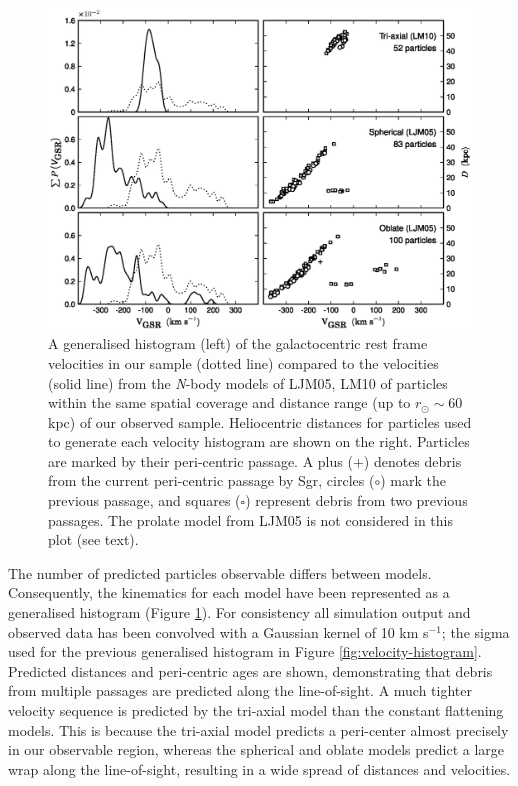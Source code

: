 \documentclass[preprint2]{aastex}
\begin{document}
	\begin{figure}[t!]
		\includegraphics[width=\textwidth]{./sgr_velocities.eps}
		\caption{A generalised histogram (left) of the galactocentric rest frame velocities in our sample (dotted line) compared to the velocities (solid line) from the \textit{N}-body models of LJM05, LM10 of particles within the same spatial coverage and distance range (up to $r_\odot \sim 60$ kpc) of our observed sample. Heliocentric distances for particles used to generate each velocity histogram are shown on the right. Particles are marked by their peri-centric passage. A plus ($+$) denotes debris from the current peri-centric passage by Sgr, circles ($\circ$) mark the previous passage, and squares ($\square$) represent debris from two previous passages. The prolate model from LJM05 is not considered in this plot (see text).}
		\label{fig:law-vel-compare}
	\end{figure}
	
	The number of predicted particles observable differs between models. Consequently, the kinematics for each model have been represented as a generalised histogram (Figure \ref{fig:law-vel-compare}). For consistency all simulation output and observed data has been convolved with a Gaussian kernel of 10 km s$^{-1}$; the sigma used for the previous generalised histogram in Figure \ref{fig:velocity-histogram}. Predicted distances and peri-centric ages are shown, demonstrating that debris from multiple passages are predicted along the line-of-sight. A much tighter velocity sequence is predicted by the tri-axial model than the constant flattening models. This is because the tri-axial model predicts a peri-center almost precisely in our observable region, whereas the spherical and oblate models predict a large wrap along the line-of-sight, resulting in a wide spread of distances and velocities.
	
\end{document}
